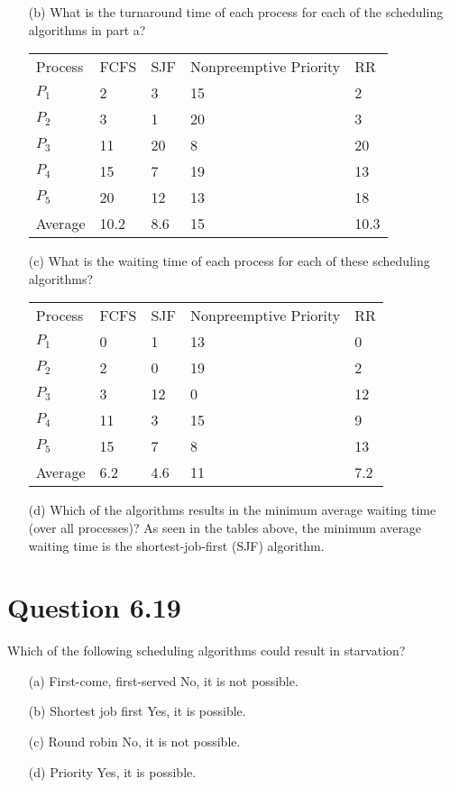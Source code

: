 \documentclass[12pt]{article}
\begin{document}
{\begin{enumerate}
\newpage
\item[(b)]What is the turnaround time of each process for each of the scheduling algorithms in part a?
\\
{\color{black}
\begin{table}[h]
\begin{tabular}{lllll}
Process & FCFS & SJF & Nonpreemptive Priority & RR \\
$P_{1}$      & 2    & 3  & 15       & 2 \\
$P_{2}$      & 3    & 1   & 20       & 3  \\
$P_{3}$      & 11   & 20  & 8        & 20 \\
$P_{4}$      & 15   & 7   & 19       & 13  \\
$P_{5}$      & 20   & 12   & 13       & 18 \\
Average & 10.2  & 8.6   & 15      &   10.3 
\end{tabular}
\end{table}
}

\item[(c)]What is the waiting time of each process for each of these scheduling algorithms?
\\
{\color{black}
\begin{table}[h1]
\begin{tabular}{lllll}
Process & FCFS & SJF & Nonpreemptive Priority & RR   \\
$P_{1}$      & 0    & 1   & 13        & 0    \\
$P_{2}$      & 2    & 0   & 19        & 2    \\
$P_{3}$      & 3    & 12  & 0        & 12   \\
$P_{4}$      & 11   & 3   & 15       & 9    \\
$P_{5}$      & 15   & 7   & 8       & 13    \\
Average & 6.2  & 4.6   & 11      & 7.2
\end{tabular}
\end{table}
}

\item[(d)]Which of the algorithms results in the minimum average waiting time (over all processes)? {\color{black}As seen in the tables above, the minimum average waiting time is the shortest-job-first (SJF) algorithm. }
\end{enumerate}
}

\section*{Question 6.19} {\color{blue}Which of the following scheduling algorithms could result in starvation?
\begin{enumerate}
\item[(a)]First-come, first-served {\color{black} No, it is not possible.}
\item[(b)]Shortest job first {\color{black} Yes, it is possible.}
\item[(c)]Round robin {\color{black} No, it is not possible.}
\item[(d)]Priority {\color{black} Yes, it is possible.}
\end{enumerate}
}
\end{document}
